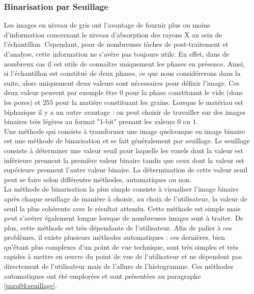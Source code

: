 		\subsubsection{Binarisation par Seuillage}\label{para03:threshold}
			Les images en niveau de gris ont l'avantage de fournir plus ou moins d'information concernant le niveau d'absorption des rayons X au sein de l'échantillon. Cependant, pour de nombreuses tâches de post-traitement et d'analyse, cette information ne s'avère pas toujours utile. En effet, dans de nombreux cas il est utile de connaître uniquement les phases en présence. Ainsi, si l'échantillon est constitué de deux phases, ce que nous considérerons dans la suite, alors uniquement deux valeurs sont nécessaires pour définir l'image. Ces deux valeur peuvent par exemple être $0$ pour la phase constituant le vide (donc les pores) et $255$ pour la matière constituant les grains. Lorsque le matériau est biphasique il y a un autre avantage : on peut choisir de travailler sur des images binaires très légères au format "1-bit" prenant les valeurs $0$ ou $1$.
			\\Une méthode qui consiste à transformer une image quelconque en image binaire est une méthode de binarisation et se fait généralement par seuillage. Le seuillage consiste à déterminer une valeur seuil pour laquelle les voxels dont la valeur est inférieure prennent la première valeur binaire tandis que ceux dont la valeur est supérieure prennent l'autre valeur binaire. La détermination de cette valeur seuil peut se faire selon différentes méthodes, automatiques ou non.
			\\La méthode de binarisation la plus simple consiste à visualiser l'image binaire après chaque seuillage de manière à choisir, au choix de l'utilisateur, la valeur de seuil la plus cohérente avec le résultat attendu. Cette méthode est simple mais peut s'avérer également longue lorsque de nombreuses images sont à traiter. De plus, cette méthode est très dépendante de l'utilisateur. Afin de palier à ces problèmes, il existe plusieurs méthodes automatiques : ces dernières, bien qu'étant plus complexes d'un point de vue technique, sont très simples et très rapides à mettre en \oe{}uvre du point de vue de l'utilisateur et ne dépendent pas directement de l'utilisateur mais de l'allure de l'histogramme. Ces méthodes automatiques ont été employées et sont présentées au paragraphe \ref{para04:seuillage}.
